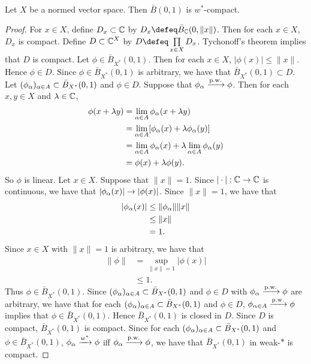 \documentclass{book}
\begin{document}
	
	
	\begin{ex}  \\
		Let $X$ be a normed vector space. Then $\bar{B}(0,1)$ is $w^*$-compact. 
	\end{ex}

	\begin{proof}
		For $x \in X$, define $D_x \subset \mathbb{C}$ by $D_x \defeq \bar{B}_{\C}(0, \|x\|)$. Then for each $x \in X$, $D_x$ is compact. Define $D \subset \mathbb{C}^X$ by $D \defeq \prod\limits_{x \in X} D_x$. Tychonoff's theorem  implies that $D$ is compact. Let $\phi \in \bar{B}_{X^*}(0,1)$. Then for each $x \in X$, $|\phi(x)| \leq \|x\|$. Hence $\phi \in D$. Since $\phi \in \bar{B}_{X^*}(0,1)$ is arbitrary, we have that $\bar{B}_{X^*}(0,1) \subset D$. Let $(\phi_{\alpha})_{\alpha \in A} \subset \bar{B}_{X^*}(0,1)$ and $\phi \in D$. Suppose that $\phi_{\alpha} \xrightarrow{\text{p.w.}} \phi$. Then for each $x,y \in X$ and $\lambda \in \mathbb{C}$,  
		\begin{align*}
			\phi(x + \lambda y)
			& = \lim_{\alpha \in A} \phi_{\alpha}(x+ \lambda y) \\
			& = \lim_{\alpha \in A} [\phi_{\alpha}(x) + \lambda \phi_{\alpha} (y)] \\
			& = \lim_{\alpha \in A} \phi_{\alpha}(x) + \lambda \lim_{\alpha \in A} \phi_{\alpha}(y) \\
			& = \phi(x) + \lambda \phi(y).
		\end{align*}
		So $\phi$ is linear. Let $x \in X$. Suppose that $\|x\|=1$. Since $|\cdot|: \mathbb{C} \rightarrow \mathbb{C}$ is continuous, we have that $|\phi_{\alpha}(x)| \rightarrow |\phi(x)|$. Since $\|x\| = 1$, we have that 
		\begin{align*}
			|\phi_{\alpha}(x)| 
			& \leq \|\phi_{\alpha}\|\|x\| \\
			& \leq \|x\| \\
			& = 1.
		\end{align*}
		Since $x \in X$ with $\|x\|=1$ is arbitrary, we have that 
		\begin{align*}
			\|\phi\|
			& = \sup\limits_{\|x\|=1} |\phi(x)| \\
			& \leq 1.
		\end{align*}
		Thus $\phi \in \bar{B}_{X^*}(0,1)$. Since $(\phi_{\alpha})_{\alpha \in A} \subset \bar{B}_{X^*}(0,1)$ and $\phi \in D$ with $\phi_{\alpha} \xrightarrow{\text{p.w.}} \phi$ are arbitrary, we have that for each $(\phi_{\alpha})_{\alpha \in A} \subset \bar{B}_{X^*}(0,1)$ and $\phi \in D$, $\phi_{\alpha \in A} \xrightarrow{\text{p.w.}} \phi$ implies that $\phi \in \bar{B}_{X^*}(0,1)$. Hence $\bar{B}_{X^*}(0,1)$ is closed in $D$. Since $D$ is compact, $\bar{B}_{X^*}(0,1)$ is compact. Since for each $(\phi_{\alpha})_{\alpha \in A} \subset \bar{B}_{X^*}(0,1)$ and $\phi \in \bar{B}_{X^*}(0,1)$, $\phi_{\alpha} \xrightarrow{w^*} \phi$ iff $\phi_{\alpha} \xrightarrow{\text{p.w.}} \phi$, we have that $\bar{B}_{X^*}(0,1)$ in weak-$*$ is compact. 
 	\end{proof}
\end{document}
